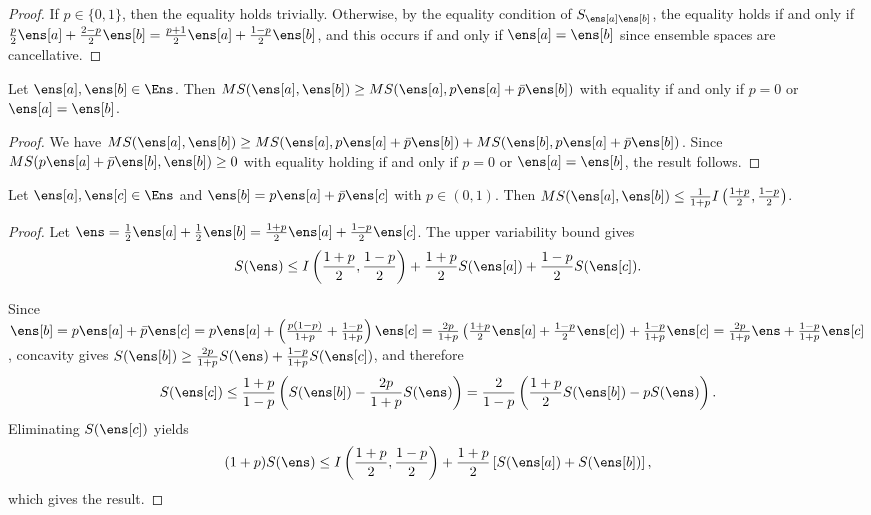 \begin{mathSection}
\begin{proof}
	If $p \in \{0,1\}$, then the equality holds trivially. Otherwise, by the equality condition of $S_{\ens[a]\ens[b]}$, the equality holds if and only if $\frac{p}{2}\ens[a] + \frac{2-p}{2}\ens[b] = \frac{p+1}{2}\ens[a] + \frac{1-p}{2}\ens[b]$, and this occurs if and only if $\ens[a]=\ens[b]$ since ensemble spaces are cancellative.
\end{proof}

\begin{coro}\label{pm-es-mixingEntropyMonotonic}
	Let $\ens[a],\ens[b] \in \Ens$. Then $MS(\ens[a],\ens[b]) \ge MS(\ens[a],p\ens[a]+\bar{p}\ens[b])$ with equality if and only if $p=0$ or $\ens[a]=\ens[b]$.
\end{coro}

\begin{proof}
	We have $MS(\ens[a],\ens[b]) \ge MS(\ens[a],p\ens[a]+\bar{p}\ens[b]) + MS(\ens[b],p\ens[a]+\bar{p}\ens[b])$. Since $MS(p\ens[a]+\bar{p}\ens[b],\ens[b]) \ge 0$ with equality holding if and only if $p=0$ or $\ens[a]=\ens[b]$, the result follows.
\end{proof}

\begin{prop}
	Let $\ens[a], \ens[c] \in \Ens$ and $\ens[b] = p\ens[a] + \bar{p}\ens[c]$ with $p \in (0,1)$. Then $MS(\ens[a],\ens[b]) \leq \frac{1}{1+p}I\left(\frac{1+p}{2},\frac{1-p}{2}\right)$.
\end{prop}

\begin{proof}
	Let $\ens = \frac{1}{2}\ens[a] + \frac{1}{2}\ens[b] = \frac{1+p}{2}\ens[a] + \frac{1-p}{2}\ens[c]$. The upper variability bound gives
	\begin{equation}
		S(\ens) \leq I\left(\frac{1+p}{2},\frac{1-p}{2}\right) + \frac{1+p}{2}S(\ens[a]) + \frac{1-p}{2}S(\ens[c]).
	\end{equation}
	
	Since $\ens[b] = p\ens[a] + \bar{p}\ens[c] = p\ens[a] + \left(\frac{p(1-p)}{1+p} + \frac{1-p}{1+p}\right)\ens[c] = \frac{2p}{1+p}\left(\frac{1+p}{2}\ens[a] + \frac{1-p}{2}\ens[c]\right) + \frac{1-p}{1+p}\ens[c] = \frac{2p}{1+p}\ens + \frac{1-p}{1+p}\ens[c]$, concavity gives $S(\ens[b]) \geq \frac{2p}{1+p}S(\ens) + \frac{1-p}{1+p}S(\ens[c])$, and therefore
	\begin{equation}
		S(\ens[c]) \leq \frac{1+p}{1-p} \left( S(\ens[b]) - \frac{2p}{1+p}S(\ens) \right) = \frac{2}{1-p} \left( \frac{1+p}{2} S(\ens[b]) - pS(\ens) \right).
	\end{equation}
	Eliminating $S(\ens[c])$ yields
	\begin{equation}
		(1+p)S(\ens) \leq I\left(\frac{1+p}{2},\frac{1-p}{2}\right) + \frac{1+p}{2}\left[S(\ens[a])+S(\ens[b])\right],
	\end{equation}
	which gives the result.
\end{proof}

\end{mathSection}

